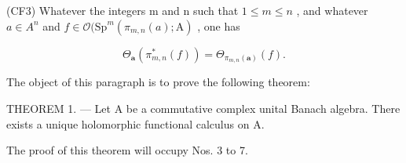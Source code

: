 (CF3) Whatever the integers m and n such that \(1 \leqslant m \leqslant n\) , and whatever \(a \in A^{n}\) and \(f \in \mathcal{O}(\mathrm{Sp}^{m}(\pi_{m,n}(a); \mathrm{A})\) , one has

\[
\Theta_ {\boldsymbol {a}} (\pi_ {m, n} ^ {*} (f)) = \Theta_ {\pi_ {m, n} (\boldsymbol {a})} (f).
\]

The object of this paragraph is to prove the following theorem:

THEOREM 1. --- Let A be a commutative complex unital Banach algebra. There exists a unique holomorphic functional calculus on A.

The proof of this theorem will occupy Nos. 3 to 7.

